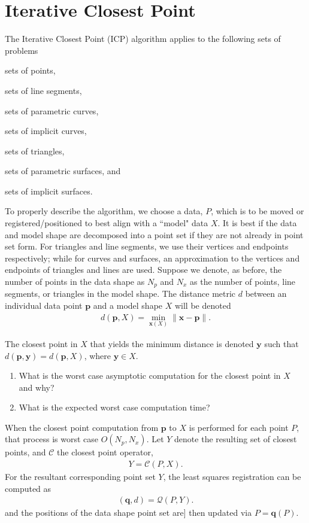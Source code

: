 \section{Iterative Closest Point}

The Iterative Closest Point (ICP) algorithm applies to the following sets of problems
%
\begin{inparaenum}[(i)]
	\item sets of points,
	\item sets of line segments,
	\item sets of parametric curves,
	\item sets of implicit curves,
	\item sets of triangles,
	\item sets of parametric surfaces, and
	\item sets of implicit surfaces.
\end{inparaenum}
%
To properly describe the algorithm, we choose a data, $P$, which is to be moved or registered/positioned to best align with a ``model" data $X$. It is best if the data and model shape are decomposed into a point set if they are not already in point set form. For triangles and line segments, we use their vertices and endpoints respectively; while for curves and surfaces, an approximation to the vertices and endpoints of triangles and lines are used. Suppose we denote, as before, the number of points in the data shape as $N_p$ and $N_x$ as the number of points, line segments, or triangles in the model shape. The distance metric $d$ between an individual data point $\bm{p}$ and a model shape $X$ will be denoted 
%
\begin{align}
	d(\bm{p}, X) = \min_{\bm{x}(X)} \|\bm{x} - \bm{p} \|.
\end{align}

The closest point in $X$ that yields the minimum distance is denoted $\bm{y}$ such that $d(\bm{p}, \bm{y}) = d(\bm{p}, X)$, where $\bm{y} \in X$.
%
\begin{quiz} 
	\begin{enumerate}
	\item What is the worst case asymptotic computation for the closest point in $X$ and why? %
	\item What is the expected worst case computation time?
	\end{enumerate}
\end{quiz}
%
When the closest point computation from $\bm{p}$ to $X$ is performed for each point $P$, that process is worst case $O(N_p, N_x)$. Let $Y$ denote the resulting set of closest points, and $\mathcal{C}$ the closest point operator, \ie 
%
\begin{align}
	Y = \mathcal{C}(P, X).
\end{align}
%
For the resultant corresponding point set $Y$, the least squares registration can be computed as
%
\begin{align}
	\left(\bm{q}, d\right) = \mathcal{Q}\left(P, Y\right).
\end{align}
%
and the positions of the data shape point set are] then updated via $P=\bm{q}(P)$.


